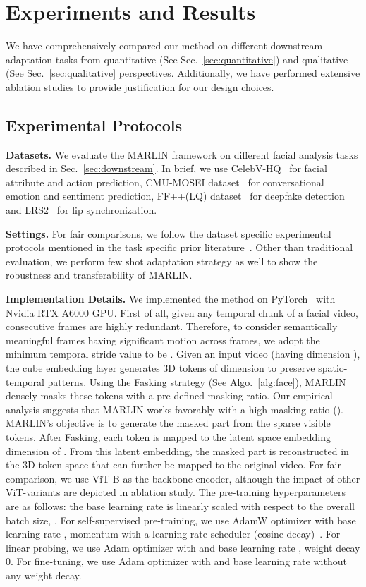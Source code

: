 \documentclass[10pt,twocolumn,letterpaper]{article}
\begin{document}
\section{Experiments and Results}\label{sec:exp_results}
We have comprehensively compared our method on different downstream adaptation tasks from quantitative (See Sec.~\ref{sec:quantitative}) and qualitative (See Sec.~\ref{sec:qualitative} perspectives. Additionally, we have performed extensive ablation studies to provide justification for our design choices.
\subsection{Experimental Protocols}
\noindent \textbf{Datasets.} We evaluate the MARLIN framework on different facial analysis tasks described in Sec.~\ref{sec:downstream}. In brief, we use CelebV-HQ~\cite{zhuCelebVHQ2022} for facial attribute and action prediction, CMU-MOSEI dataset~\cite{bagherzadehMultimodal2018} for conversational emotion and sentiment prediction, FF++(LQ) dataset~\cite{rosslerFaceForensics2019} for deepfake detection and LRS2~\cite{chungLip2017} for lip synchronization.

\noindent \textbf{Settings.} For fair comparisons, we follow the dataset specific experimental protocols mentioned in the task specific prior literature~\cite{liuDeep2015,ghoshAutomatic2018a,zhengGeneral2022,rosslerFaceForensics2019,chungLip2017,bagherzadehMultimodal2018}. Other than traditional evaluation, we perform few shot adaptation strategy as well to show the robustness and transferability of MARLIN.

\noindent \textbf{Implementation Details.} We implemented the method on PyTorch~\cite{paszkePyTorch2019} with Nvidia RTX A6000 GPU. First of all, given any temporal chunk of a facial video, consecutive frames are highly redundant. Therefore, to consider semantically meaningful frames having significant motion across frames, we adopt the minimum temporal stride value to be . Given an input video (having dimension ), the cube embedding layer generates  3D tokens of dimension  to preserve spatio-temporal patterns. Using the Fasking strategy (See Algo.~\ref{alg:face}), MARLIN densely masks these tokens with a pre-defined masking ratio. Our empirical analysis suggests that MARLIN works favorably with a high masking ratio (). MARLIN's objective is to generate the masked part from the sparse visible tokens. After Fasking, each token is mapped to the latent space embedding dimension of . From this latent embedding, the masked part is reconstructed in the 3D token space that can further be mapped to the original video.
For fair comparison, we use ViT-B as the backbone encoder, although the impact of other ViT-variants are depicted in ablation study.
The pre-training hyperparameters are as follows: the base learning rate is linearly scaled with respect to the overall batch size, . For self-supervised pre-training, we use AdamW optimizer with base learning rate , momentum  with a learning rate scheduler (cosine decay)~\cite{loshchilovSGDR2022}. For linear probing, we use Adam optimizer with  and base learning rate , weight decay 0. For fine-tuning, we use Adam optimizer with  and base learning rate  without any weight decay. 
\end{document}
